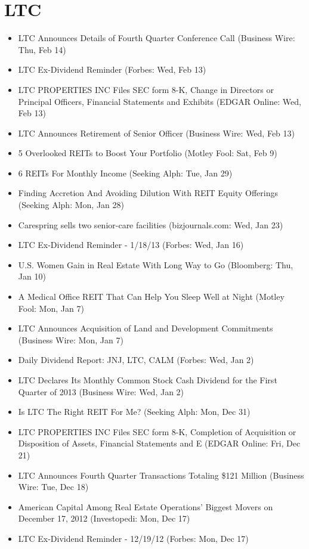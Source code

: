 \documentclass[11pt,asymmetric]{article}
\begin{document}
\section*{LTC}
\begin{itemize}
\item LTC Announces Details of Fourth Quarter Conference Call (Business Wire: Thu, Feb 14)
\item LTC Ex-Dividend Reminder (Forbes: Wed, Feb 13)
\item LTC PROPERTIES INC Files SEC form 8-K, Change in Directors or Principal Officers, Financial Statements and Exhibits (EDGAR Online: Wed, Feb 13)
\item LTC Announces Retirement of Senior Officer (Business Wire: Wed, Feb 13)
\item 5 Overlooked REITs to Boost Your Portfolio (Motley Fool: Sat, Feb 9)
\item 6 REITs For Monthly Income (Seeking Alph: Tue, Jan 29)
\item Finding Accretion And Avoiding Dilution With REIT Equity Offerings (Seeking Alph: Mon, Jan 28)
\item Carespring sells two senior-care facilities (bizjournals.com: Wed, Jan 23)
\item LTC Ex-Dividend Reminder - 1/18/13 (Forbes: Wed, Jan 16)
\item U.S. Women Gain in Real Estate With Long Way to Go (Bloomberg: Thu, Jan 10)
\item A Medical Office REIT That Can Help You Sleep Well at Night (Motley Fool: Mon, Jan 7)
\item LTC Announces Acquisition of Land and Development Commitments (Business Wire: Mon, Jan 7)
\item Daily Dividend Report: JNJ, LTC, CALM (Forbes: Wed, Jan 2)
\item LTC Declares Its Monthly Common Stock Cash Dividend for the First Quarter of 2013 (Business Wire: Wed, Jan 2)
\item Is LTC The Right REIT For Me? (Seeking Alph: Mon, Dec 31)
\item LTC PROPERTIES INC Files SEC form 8-K, Completion of Acquisition or Disposition of Assets, Financial Statements and E (EDGAR Online: Fri, Dec 21)
\item LTC Announces Fourth Quarter Transactions Totaling \$121 Million (Business Wire: Tue, Dec 18)
\item American Capital Among Real Estate Operations' Biggest Movers on December 17, 2012 (Investopedi: Mon, Dec 17)
\item LTC Ex-Dividend Reminder - 12/19/12 (Forbes: Mon, Dec 17)

\end{itemize}
\end{document}
